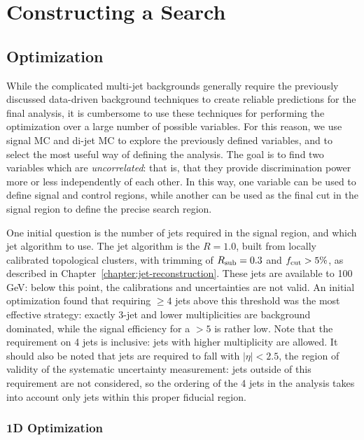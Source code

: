 \section{Constructing a Search}
\label{chapter:search:search}

\subsection{Optimization}
\label{chapter:search:search:optimization}

While the complicated multi-jet backgrounds generally require the previously discussed data-driven background techniques to create reliable predictions for the final analysis, it is cumbersome to use these techniques for performing the optimization over a large number of possible variables. For this reason, we use signal MC and \herwigpp di-jet MC to explore the previously defined variables, and to select the most useful way of defining the analysis. The goal is to find two variables which are \textit{uncorrelated}: that is, that they provide discrimination power more or less independently of each other. In this way, one variable can be used to define signal and control regions, while another can be used as the final cut in the signal region to define the precise search region.

One initial question is the number of jets required in the signal region, and which jet algorithm to use. The jet algorithm is the \antikt $R=1.0$, built from locally calibrated topological clusters, with trimming of $R_{\rm sub} = 0.3$ and $f_{\rm cut} > 5\%$, as described in Chapter~\ref{chapter:jet-reconstruction}. These jets are available to 100 GeV: below this point, the calibrations and uncertainties are not valid. An initial optimization found that requiring $\geq 4$ jets above this threshold was the most effective strategy: exactly 3-jet and lower multiplicities are background dominated, while the signal efficiency for a $> 5$ is rather low. Note that the requirement on 4 jets is inclusive: jets with higher multiplicity are allowed. It should also be noted that jets are required to fall with $|\eta| < 2.5$, the region of validity of the systematic uncertainty measurement: jets outside of this requirement are not considered, so the ordering of the 4 jets in the analysis takes into account only jets within this proper fiducial region.

\subsubsection{1D Optimization}

